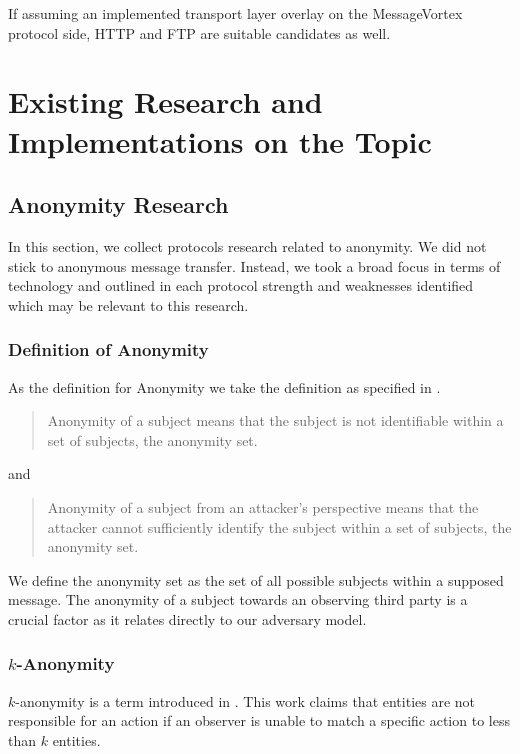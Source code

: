 
If assuming an implemented transport layer overlay on the MessageVortex protocol side, HTTP and FTP are suitable candidates as well.

\chapter{Existing Research and Implementations on the Topic \label{sec:existingRD}}
\section{Anonymity Research}
In this section, we collect protocols research related to anonymity. We did not stick to anonymous message transfer. Instead, we took a broad focus in terms of technology and outlined in each protocol strength and weaknesses identified which may be relevant to this research.

\subsection{Definition of Anonymity}
As the definition for Anonymity we take the definition as specified in \cite{anon_terminology}.

\begin{quote}
	Anonymity of a subject means that the subject is not identifiable within a set of subjects, the anonymity set.\omitted
\end{quote}
and
\begin{quote}
	Anonymity of a subject from an attacker's perspective means that the attacker cannot sufficiently identify the subject within a set of subjects, the anonymity set.\omitted
\end{quote}

We define the anonymity set as the set of all possible subjects within a supposed message. The anonymity of a subject towards an observing third party is a crucial factor as it relates directly to our adversary model.

\subsection{$k$-Anonymity}
$k$-anonymity is a term introduced in \cite{k-anonymous:ccs2003}. This work claims that entities are not responsible for an action if an observer is unable to match a specific action to less than $k$ entities.

